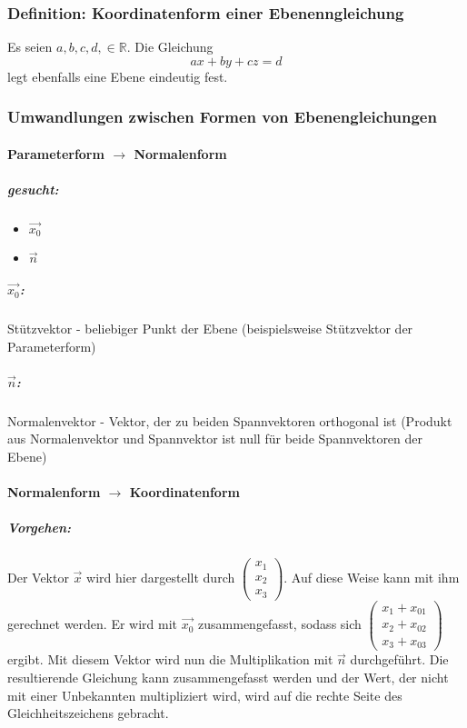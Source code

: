 \documentclass{article}
\begin{document}
  \subsubsection{Definition: Koordinatenform einer Ebenenngleichung}
  Es seien $a, b, c, d, \in \mathbb{R}$. Die Gleichung 
  \begin{equation*}
  	ax + by + cz = d
  \end{equation*}
  legt ebenfalls eine Ebene eindeutig fest.
  
  \subsubsection{Umwandlungen zwischen Formen von Ebenengleichungen}
  
  \paragraph{Parameterform $\rightarrow$ Normalenform} 
  \subparagraph{gesucht:}
  \begin{itemize}
  	\item $\vec{x_0}$
  	\item $\vec{n}$
  \end{itemize}
  \subparagraph{$\vec{x_0}$:}
  Stützvektor - beliebiger Punkt der Ebene (beispielsweise Stützvektor der Parameterform)
  
  \subparagraph{$\vec{n}$:}
  Normalenvektor - Vektor, der zu beiden Spannvektoren orthogonal ist (Produkt aus Normalenvektor und Spannvektor ist null für beide Spannvektoren der Ebene)
  
  \paragraph{Normalenform $\rightarrow$ Koordinatenform}
  \subparagraph{Vorgehen:}
  Der Vektor $\vec{x}$ wird hier dargestellt durch
  $\begin{pmatrix}
  	x_1 \\
  	x_2 \\
  	x_3
  \end{pmatrix}$.
  Auf diese Weise kann mit ihm gerechnet werden. Er wird mit $\vec{x_0}$ zusammengefasst, sodass sich
  $\begin{pmatrix}
  	x_1 + x_{01} \\
  	x_2 + x_{02} \\
  	x_3 + x_{03}
  \end{pmatrix}$
  ergibt. Mit diesem Vektor wird nun die Multiplikation mit $\vec{n}$ durchgeführt. Die resultierende Gleichung kann zusammengefasst werden und der Wert, der nicht mit einer Unbekannten multipliziert wird, wird auf die rechte Seite des Gleichheitszeichens gebracht. 
  
\end{document}
